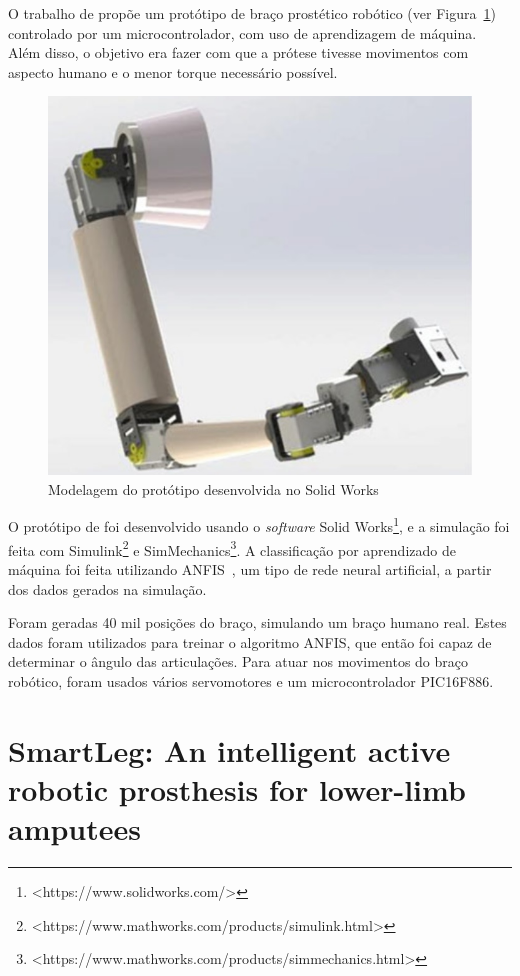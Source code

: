 
O trabalho de  propõe um protótipo de braço prostético robótico (ver Figura~\ref{fig:rel_kumar_1}) controlado por um microcontrolador, com uso de aprendizagem de máquina. Além disso, o objetivo era fazer com que a prótese tivesse movimentos com aspecto humano e o menor torque necessário possível.

\begin{figure}[!htp]
	\caption{\label{fig:rel_kumar_1}Modelagem do protótipo desenvolvida no Solid Works}
	\begin{center}
	    \includegraphics[width=.3\textwidth]{resources/rel_kumar_1}
	\end{center}
\end{figure}

O protótipo de  foi desenvolvido usando o \textit{software} Solid Works\footnote{<https://www.solidworks.com/>}, e a simulação foi feita com Simulink\footnote{<https://www.mathworks.com/products/simulink.html>} e SimMechanics\footnote{<https://www.mathworks.com/products/simmechanics.html>}. A classificação por aprendizado de máquina foi feita utilizando ANFIS~\cite{jang:1993anfis}, um tipo de rede neural artificial, a partir dos dados gerados na simulação.

Foram geradas 40 mil posições do braço, simulando um braço humano real. Estes dados foram utilizados para treinar o algoritmo ANFIS, que então foi capaz de determinar o ângulo das articulações. Para atuar nos movimentos do braço robótico, foram usados vários servomotores e um microcontrolador PIC16F886.


\section{SmartLeg: An intelligent active robotic prosthesis for lower-limb amputees}\label{sec:rel_smartleg}

